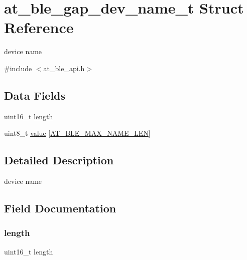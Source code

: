 \hypertarget{structat__ble__gap__dev__name__t}{}\section{at\+\_\+ble\+\_\+gap\+\_\+dev\+\_\+name\+\_\+t Struct Reference}
\label{structat__ble__gap__dev__name__t}


device name  




{\ttfamily \#include $<$at\+\_\+ble\+\_\+api.\+h$>$}

\subsection*{Data Fields}
\begin{DoxyCompactItemize}
\item 
uint16\+\_\+t \mbox{\hyperlink{structat__ble__gap__dev__name__t_a1892eba2086d12ac2b09005aeb09ea3b}{length}}
\item 
uint8\+\_\+t \mbox{\hyperlink{structat__ble__gap__dev__name__t_a475c040a11281f79de92f073c7521dc5}{value}} \mbox{[}\mbox{\hyperlink{at__ble__api_8h_ade8ce3f882f05dd2b9e5da4c2d6142ba}{A\+T\+\_\+\+B\+L\+E\+\_\+\+M\+A\+X\+\_\+\+N\+A\+M\+E\+\_\+\+L\+EN}}\mbox{]}
\end{DoxyCompactItemize}


\subsection{Detailed Description}
device name 

\subsection{Field Documentation}
\mbox{\label{structat__ble__gap__dev__name__t_a1892eba2086d12ac2b09005aeb09ea3b}} 
\subsubsection{\texorpdfstring{length}{length}}
{\footnotesize\ttfamily uint16\+\_\+t length}

\mbox{\label{structat__ble__gap__dev__name__t_a475c040a11281f79de92f073c7521dc5}} 
